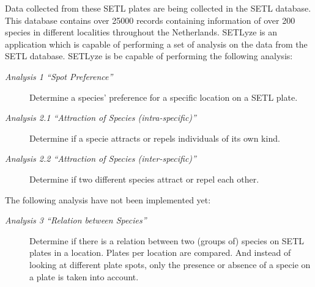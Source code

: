\documentclass[letterpaper,10pt,english]{sphinxmanual}
\begin{document}
Data collected from these SETL plates are being collected in
the SETL database. This database contains over 25000 records containing
information of over 200 species in different localities throughout the
Netherlands. SETLyze is an application which is capable of performing
a set of analysis on the data from the SETL database. SETLyze is
be capable of performing the following analysis:
\begin{description}
\item[{\emph{Analysis 1 ``Spot Preference''}}] \leavevmode
Determine a species’ preference for a specific location on a SETL
plate.

\item[{\emph{Analysis 2.1 ``Attraction of Species (intra-specific)''}}] \leavevmode
Determine if a specie attracts or repels individuals of its own kind.

\item[{\emph{Analysis 2.2 ``Attraction of Species (inter-specific)''}}] \leavevmode
Determine if two different species attract or repel each other.

\end{description}

The following analysis have not been implemented yet:
\begin{description}
\item[{\emph{Analysis 3 ``Relation between Species''}}] \leavevmode
Determine if there is a relation between two (groups of) species on
SETL plates in a location. Plates per location are compared. And
instead of looking at different plate spots, only the presence or
absence of a specie on a plate is taken into account.

\end{description}
\end{document}
